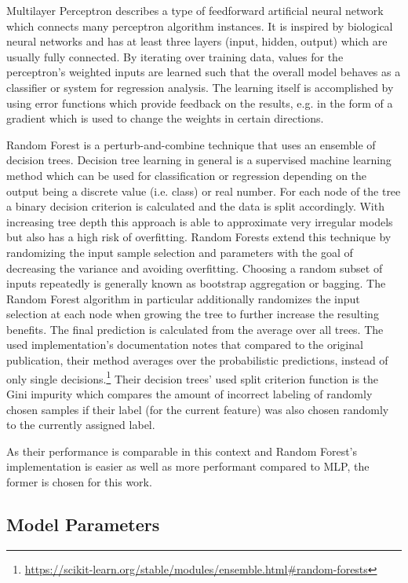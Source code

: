 \documentclass[
    fontsize=12pt,
    headings=small,
    parskip=half,           %
    bibliography=totoc,
    numbers=noenddot,       %
    open=any,               %
    final,                   %
    table
]{scrreprt}
\begin{document}
Multilayer Perceptron describes a type of feedforward artificial neural network which connects many perceptron algorithm instances. It is inspired by biological neural networks and has at least three layers (input, hidden, output) which are usually fully connected. By iterating over training data, values for the perceptron's weighted inputs are learned such that the overall model behaves as a classifier or system for regression analysis. The learning itself is accomplished by using error functions which provide feedback on the results, e.g. in the form of a gradient which is used to change the weights in certain directions.

Random Forest\cite{Breiman2001} is a perturb-and-combine technique that uses an ensemble of decision trees. Decision tree learning in general is a supervised machine learning method which can be used for classification or regression depending on the output being a discrete value (i.e. class) or real number. For each node of the tree a binary decision criterion is calculated and the data is split accordingly. With increasing tree depth this approach is able to approximate very irregular models but also has a high risk of overfitting. Random Forests extend this technique by randomizing the input sample selection and parameters with the goal of decreasing the variance and avoiding overfitting. Choosing a random subset of inputs repeatedly is generally known as bootstrap  aggregation or bagging. The Random Forest algorithm in particular additionally randomizes the input selection at each node when growing the tree to further increase the resulting benefits. The final prediction is calculated from the average over all trees. The used implementation's documentation notes that compared to the original publication, their method averages over the probabilistic predictions, instead of only single decisions.\footnote{\url{https://scikit-learn.org/stable/modules/ensemble.html\#random-forests}} Their decision trees' used split criterion function is the Gini impurity which compares the amount of incorrect labeling of randomly chosen samples if their label (for the current feature) was also chosen randomly to the currently assigned label.

As their performance is comparable in this context and Random Forest's implementation is easier as well as more performant compared to MLP, the former is chosen for this work.

\subsection{Model Parameters}
\end{document}
